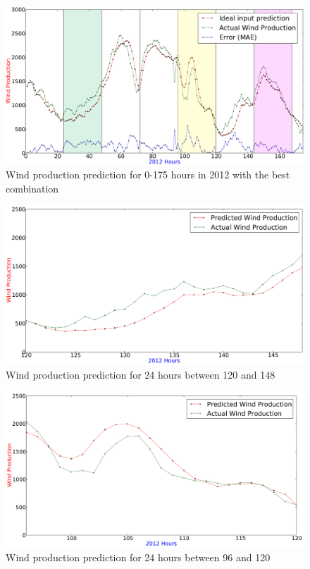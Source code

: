\begin{figure}[H]
\centering
\includegraphics[width=0.99\linewidth]{billeder/bestInputParameterPrediction.png}
\caption{Wind production prediction for 0-175 hours in 2012 with the best combination}
\label{fig:bestInputParameterPrediction}
\end{figure} 

\begin{figure}[H]
\centering
\includegraphics[width=0.99\linewidth]{billeder/bestInputCombi120-148.png}
\caption{Wind production prediction for 24 hours between 120 and 148}
\label{fig:bestInputCombi120-148}
\end{figure} 

\begin{figure}[H]
\centering
\includegraphics[width=0.99\linewidth]{billeder/bestInputCombi96-120.png}
\caption{Wind production prediction for 24 hours between 96 and 120}
\label{fig:bestInputCombi96-120}
\end{figure}   

